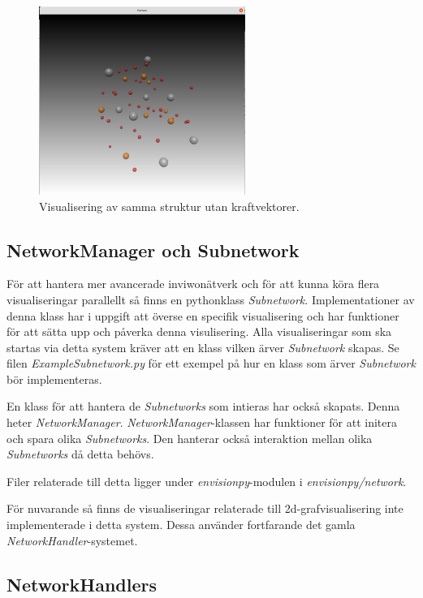 \documentclass[10pt,oneside,swedish]{article}
\begin{document}
\begin{figure}[H]
\centering
\includegraphics[width=0.60000\textwidth]{Images/force_vectors_disabled.png}
\caption{Visualisering av samma struktur utan kraftvektorer.}
\end{figure}


\subsection{NetworkManager och
Subnetwork}\label{networkmanager-och-subnetwork}

För att hantera mer avancerade inviwonätverk och för att kunna köra
flera visualiseringar parallellt så finns en pythonklass
\emph{Subnetwork}. Implementationer av denna klass har i uppgift att
överse en specifik visualisering och har funktioner för att sätta upp
och påverka denna visulisering. Alla visualiseringar som ska startas via
detta system kräver att en klass vilken ärver \emph{Subnetwork} skapas.
Se filen \emph{ExampleSubnetwork.py} för ett exempel på hur en klass som
ärver \emph{Subnetwork} bör implementeras.

En klass för att hantera de \emph{Subnetworks} som intieras har också
skapats. Denna heter \emph{NetworkManager}.
\emph{NetworkManager}-klassen har funktioner för att initera och spara
olika \emph{Subnetworks}. Den hanterar också interaktion mellan olika
\emph{Subnetworks} då detta behövs.

Filer relaterade till detta ligger under \emph{envisionpy}-modulen i
\emph{envisionpy/network}.

För nuvarande så finns de visualiseringar relaterade till
2d-grafvisualisering inte implementerade i detta system. Dessa använder
fortfarande det gamla \emph{NetworkHandler}-systemet.

\subsection{NetworkHandlers}\label{networkhandlers}
\end{document}
